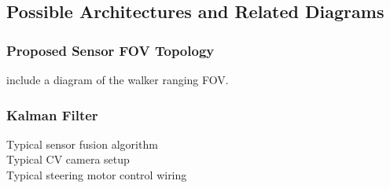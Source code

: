 \subsection{Possible Architectures and Related Diagrams}

\subsubsection{Proposed Sensor FOV Topology}
\noindent include a diagram of the walker ranging FOV.

\subsubsection{Kalman Filter}
\noindent Typical sensor fusion algorithm\\

\noindent Typical CV camera setup\\

\noindent Typical steering motor control wiring\\